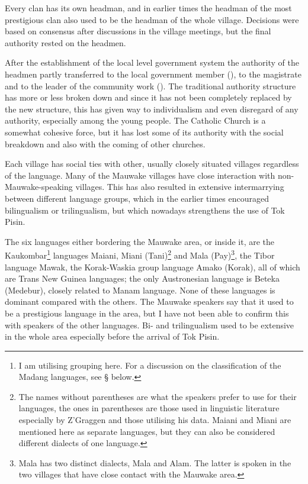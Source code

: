 Every clan has its own headman, and in earlier times the headman of the most prestigious clan also used to be the headman of the whole village. Decisions were based on consensus after discussions in the village meetings, but the final authority rested on the headmen.

After the establishment of the local level government system the authority of the headmen partly transferred to the local government member (), to the magistrate and to the leader of the community work (). The traditional authority structure has more or less broken down and since it has not been completely replaced by the new structure, this has given way to individualism and even disregard of any authority, especially among the young people. The Catholic Church is a somewhat cohesive force, but it has lost some of its authority with the social breakdown and also with the coming of other churches.

Each village has social ties with other, usually closely situated villages regardless of the language.  Many of the Mauwake villages have close interaction with non-Mauwake-speaking villages.  This has also resulted in extensive intermarrying between different language groups, which in the earlier times encouraged bilingualism or trilingualism, but which nowadays strengthens the use of Tok Pisin.

The six languages either bordering the Mauwake area, or inside it, are the Kaukombar\footnote{I am utilising  grouping here. For a discussion on the classification of the Madang languages, see {\S} below.} languages Maiani, Miani (Tani)\footnote{The names without parentheses are what the speakers prefer to use for their languages, the ones in parentheses are those used in linguistic literature especially by Z'Graggen and those utilising his data. Maiani and Miani are mentioned here as separate languages, but they can also be considered different dialects of one language.}  and Mala (Pay)\footnote{Mala has two distinct dialects, Mala and Alam. The latter is spoken in the two villages that have close contact with the Mauwake area.}, the Tibor language Mawak, the Korak-Waskia group language Amako (Korak), all of which are Trans New Guinea languages; the only Austronesian language is Beteka (Medebur), closely related to Manam language. None of these languages is dominant compared with the others.  The Mauwake speakers say that it used to be a prestigious language in the area, but I have not been able to confirm this with speakers of the other languages. Bi- and trilingualism used to be extensive in the whole area especially before the arrival of Tok Pisin. 


